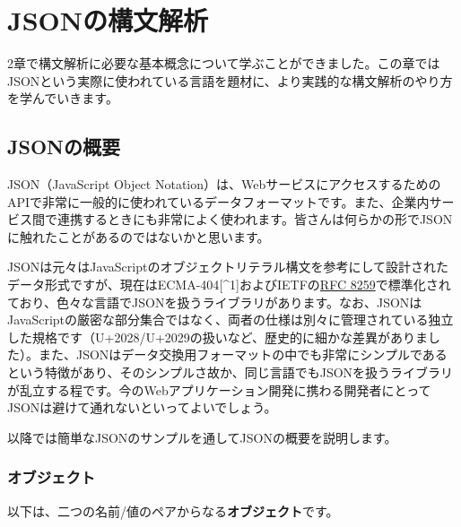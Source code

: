\hypertarget{chapter3-jsonux306eux69cbux6587ux89e3ux6790}{%
\chapter{JSONの構文解析}\label{chapter3-jsonux306eux69cbux6587ux89e3ux6790}}

2章で構文解析に必要な基本概念について学ぶことができました。この章ではJSONという実際に使われている言語を題材に、より実践的な構文解析のやり方を学んでいきます。

\hypertarget{chapter3-jsonux306eux6982ux8981}{%
\section{JSONの概要}\label{chapter3-jsonux306eux6982ux8981}}

JSON（JavaScript Object
Notation）は、WebサービスにアクセスするためのAPIで非常に一般的に使われているデータフォーマットです。また、企業内サービス間で連携するときにも非常によく使われます。皆さんは何らかの形でJSONに触れたことがあるのではないかと思います。

JSONは元々はJavaScriptのオブジェクトリテラル構文を参考にして設計されたデータ形式ですが、現在はECMA-404{[}\^{}1{]}およびIETFの\href{https://datatracker.ietf.org/doc/html/rfc8259}{RFC
8259}で標準化されており、色々な言語でJSONを扱うライブラリがあります。なお、JSONはJavaScriptの厳密な部分集合ではなく、両者の仕様は別々に管理されている独立した規格です（U+2028/U+2029の扱いなど、歴史的に細かな差異がありました）。また、JSONはデータ交換用フォーマットの中でも非常にシンプルであるという特徴があり、そのシンプルさ故か、同じ言語でもJSONを扱うライブラリが乱立する程です。今のWebアプリケーション開発に携わる開発者にとってJSONは避けて通れないといってよいでしょう。

以降では簡単なJSONのサンプルを通してJSONの概要を説明します。

\hypertarget{chapter3-ux30aaux30d6ux30b8ux30a7ux30afux30c8}{%
\subsection{オブジェクト}\label{chapter3-ux30aaux30d6ux30b8ux30a7ux30afux30c8}}

以下は、二つの名前/値のペアからなる\textbf{オブジェクト}です。

\begin{Shaded}
\begin{Highlighting}[]
\NormalTok{\{}
  \OperatorTok{:} \OperatorTok{,}
  \OperatorTok{:}  
\NormalTok{\}}
\end{Highlighting}
\end{Shaded}

